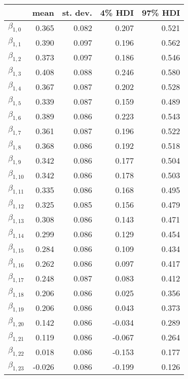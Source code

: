 \begin{tabular}{lrrrr}
\toprule
{} &   mean &  st. dev. &  4\% HDI &  97\% HDI \\
\midrule
$\beta_{1,0}$  &  0.365 &     0.082 &    0.207 &     0.521 \\
$\beta_{1,1}$  &  0.390 &     0.097 &    0.196 &     0.562 \\
$\beta_{1,2}$  &  0.373 &     0.097 &    0.186 &     0.546 \\
$\beta_{1,3}$  &  0.408 &     0.088 &    0.246 &     0.580 \\
$\beta_{1,4}$  &  0.367 &     0.087 &    0.202 &     0.528 \\
$\beta_{1,5}$  &  0.339 &     0.087 &    0.159 &     0.489 \\
$\beta_{1,6}$  &  0.389 &     0.086 &    0.223 &     0.543 \\
$\beta_{1,7}$  &  0.361 &     0.087 &    0.196 &     0.522 \\
$\beta_{1,8}$  &  0.368 &     0.086 &    0.192 &     0.518 \\
$\beta_{1,9}$  &  0.342 &     0.086 &    0.177 &     0.504 \\
$\beta_{1,10}$ &  0.342 &     0.086 &    0.178 &     0.503 \\
$\beta_{1,11}$ &  0.335 &     0.086 &    0.168 &     0.495 \\
$\beta_{1,12}$ &  0.325 &     0.085 &    0.156 &     0.479 \\
$\beta_{1,13}$ &  0.308 &     0.086 &    0.143 &     0.471 \\
$\beta_{1,14}$ &  0.299 &     0.086 &    0.129 &     0.454 \\
$\beta_{1,15}$ &  0.284 &     0.086 &    0.109 &     0.434 \\
$\beta_{1,16}$ &  0.262 &     0.086 &    0.097 &     0.417 \\
$\beta_{1,17}$ &  0.248 &     0.087 &    0.083 &     0.412 \\
$\beta_{1,18}$ &  0.206 &     0.086 &    0.025 &     0.356 \\
$\beta_{1,19}$ &  0.206 &     0.086 &    0.043 &     0.373 \\
$\beta_{1,20}$ &  0.142 &     0.086 &   -0.034 &     0.289 \\
$\beta_{1,21}$ &  0.119 &     0.086 &   -0.067 &     0.264 \\
$\beta_{1,22}$ &  0.018 &     0.086 &   -0.153 &     0.177 \\
$\beta_{1,23}$ & -0.026 &     0.086 &   -0.199 &     0.126 \\

\end{tabular}

